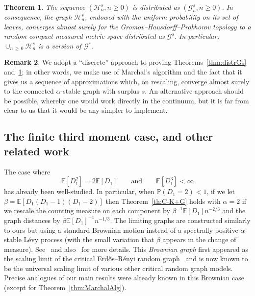 \documentclass[10pt]{amsart}
\newtheorem{theo}{Theorem}[section]
\theoremstyle{definition}\newtheorem{defi}[theo]{Definition}\newtheorem{rema}[theo]{Remark}\newtheorem{exam}[theo]{Example}\newtheorem{exem}[theo]{Example}\newtheorem{nota}[theo]{Notation}
\newcommand{\E}[1]{\ensuremath{\mathbb{E} \left[#1 \right]}}
\newcommand{\cG}{\mathcal{G}}
\newcommand{\cH}{\mathcal{H}}
\newcommand{\bbP}{\mathbb{P}}
\begin{document}

\begin{theo}\label{th:linebreaking}
The sequence $(\cH^s_n, n\geq 0)$ is distributed as $(\cG^s_n, n\geq 0)$. In consequence, the graph $\cH^s_n$, endowed with the uniform probability on its set of leaves, converges almost surely for the Gromov--Hausdorff--Prokhorov topology to a random compact measured metric space distributed as $\cG^s$. In particular, $\overline{\cup_{n\,\geq\,0} \cH^s_{n}}$ is a version of $\cG^s$.
\end{theo}


\begin{rema}
We adopt a ``discrete'' approach to proving Theorems~\ref{thm:distrGs} and~\ref{th:linebreaking}; in other words, we make use of Marchal's algorithm and the fact that it gives us a sequence of approximations which, on rescaling, converge almost surely to the connected $\alpha$-stable graph with surplus $s$. An alternative approach should be possible, whereby one would work directly in the continuum, but it is far from clear to us that it would be any simpler to implement.
\end{rema}

\subsection{The finite third moment case, and other related work}\label{sec:brownian}

The case where
\[
\E{D_1^2}=2 \E{D_1} \qquad \text{and} \qquad \E{D_1^3}<\infty
\]
has already been well-studied. In particular, when $\bbP(D_1 = 2) < 1$, if we let $\beta=\E{D_1(D_1-1)(D_1-2)}$ then Theorem~\ref{th:C-K+G} holds with $\alpha=2$ if we rescale the counting measure on each component by $\beta^{-1} \E{D_1}n^{-2/3} $ and the graph distances by $\beta \E{D_1}^{-1} n^{-1/3}$. The limiting graphs are constructed similarly to ours but using a standard Brownian motion instead of a spectrally positive $\alpha$-stable Lévy process (with the small variation that $\beta$ appears in the change of measure). See~\cite[Theorem~2.4 and Construction~3.5]{BS16+} and also~\cite{CKG17+} for more details. This \emph{Brownian graph} first appeared as the scaling limit of the critical Erd\H{o}s--Rényi random graph~\cite{ABBrGo12} and is now known to be the universal scaling limit of various other critical random graph models. Precise analogues of our main results were already known in this Brownian case (except for Theorem~\ref{thm:MarchalAlg}).
\end{document}
